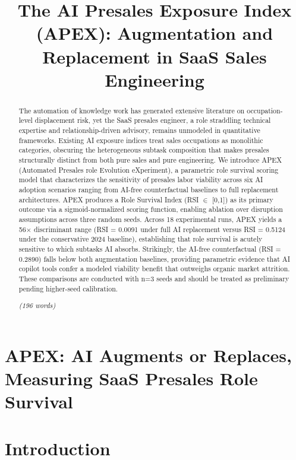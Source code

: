 \documentclass[10pt, conference]{IEEEtran}
\title{The AI Presales Exposure Index (APEX): Augmentation and Replacement in SaaS Sales Engineering}
\author{\IEEEauthorblockN{Akash Anipakalu Giridhar}}
\begin{document}
\begin{abstract}
The automation of knowledge work has generated extensive literature on occupation-level displacement risk, yet the SaaS presales engineer, a role straddling technical expertise and relationship-driven advisory, remains unmodeled in quantitative frameworks. Existing AI exposure indices \cite{chang2024survey} treat sales occupations as monolithic categories, obscuring the heterogeneous subtask composition that makes presales structurally distinct from both pure sales and pure engineering. We introduce APEX (Automated Presales role Evolution eXperiment), a parametric role survival scoring model that characterizes the sensitivity of presales labor viability across six AI adoption scenarios ranging from AI-free counterfactual baselines to full replacement architectures. APEX produces a Role Survival Index (RSI $\in$ [0,1]) as its primary outcome via a sigmoid-normalized scoring function, enabling ablation over disruption assumptions across three random seeds. Across 18 experimental runs, APEX yields a 56$\times$ discriminant range (RSI = 0.0091 under full AI replacement versus RSI = 0.5124 under the conservative 2024 baseline), establishing that role survival is acutely sensitive to which subtasks AI absorbs. Strikingly, the AI-free counterfactual (RSI = 0.2890) falls below both augmentation baselines, providing parametric evidence that AI copilot tools confer a modeled viability benefit that outweighs organic market attrition. These comparisons are conducted with n=3 seeds and should be treated as preliminary pending higher-seed calibration.

\textit{(196 words)}
\end{abstract}

\maketitle
\begin{abstract}

\end{abstract}

\section{APEX: AI Augments or Replaces, Measuring SaaS Presales Role Survival}

\label{sec:apex_ai_augments_or_replaces_measuring_s}

\section{Introduction}
\end{document}
